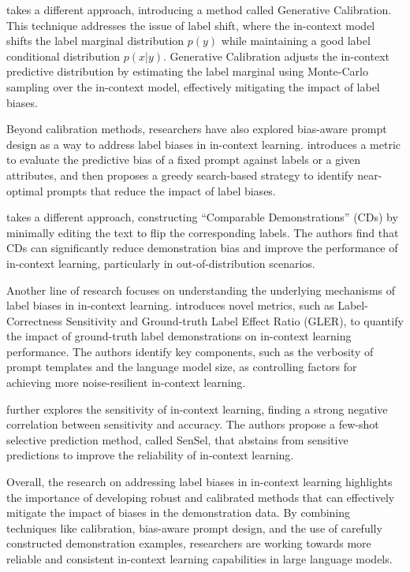 \documentclass[11pt]{article}
\begin{document}
\cite{ref89} takes a different approach, introducing a method called Generative Calibration. This technique addresses the issue of label shift, where the in-context model shifts the label marginal distribution \(p(y)\) while maintaining a good label conditional distribution \(p(x|y)\). Generative Calibration adjusts the in-context predictive distribution by estimating the label marginal using Monte-Carlo sampling over the in-context model, effectively mitigating the impact of label biases.

Beyond calibration methods, researchers have also explored bias-aware prompt design as a way to address label biases in in-context learning. \cite{ref90} introduces a metric to evaluate the predictive bias of a fixed prompt against labels or a given attributes, and then proposes a greedy search-based strategy to identify near-optimal prompts that reduce the impact of label biases.

\cite{ref91} takes a different approach, constructing ``Comparable Demonstrations'' (CDs) by minimally editing the text to flip the corresponding labels. The authors find that CDs can significantly reduce demonstration bias and improve the performance of in-context learning, particularly in out-of-distribution scenarios.

Another line of research focuses on understanding the underlying mechanisms of label biases in in-context learning. \cite{ref92} introduces novel metrics, such as Label-Correctness Sensitivity and Ground-truth Label Effect Ratio (GLER), to quantify the impact of ground-truth label demonstrations on in-context learning performance. The authors identify key components, such as the verbosity of prompt templates and the language model size, as controlling factors for achieving more noise-resilient in-context learning.

\cite{ref93} further explores the sensitivity of in-context learning, finding a strong negative correlation between sensitivity and accuracy. The authors propose a few-shot selective prediction method, called SenSel, that abstains from sensitive predictions to improve the reliability of in-context learning.

Overall, the research on addressing label biases in in-context learning highlights the importance of developing robust and calibrated methods that can effectively mitigate the impact of biases in the demonstration data. By combining techniques like calibration, bias-aware prompt design, and the use of carefully constructed demonstration examples, researchers are working towards more reliable and consistent in-context learning capabilities in large language models.
\end{document}

